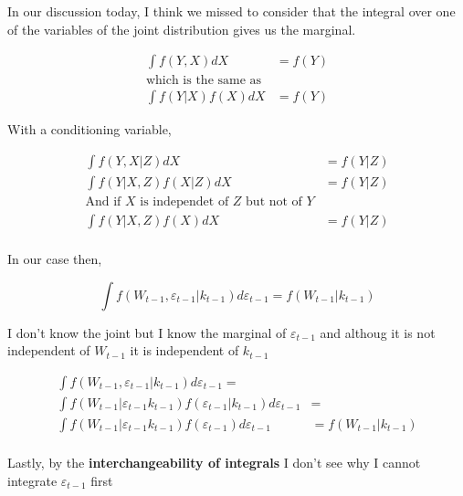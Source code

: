 \documentclass[
  letterpaper,
  DIV=11,
  numbers=noendperiod]{scrartcl}
\author{}
\date{}
\begin{document}
In our discussion today, I think we missed to consider that the integral
over one of the variables of the joint distribution gives us the
marginal.

\[
\begin{aligned}
\int f(Y,X) dX &= f(Y)\\
\text{which is the same as }\\
\int f(Y|X) f(X) dX &= f(Y)
\end{aligned}
\]

With a conditioning variable,

\[
\begin{aligned}
\int f(Y,X|Z) dX &= f(Y|Z)\\
\int f(Y|X,Z) f(X|Z) dX &= f(Y|Z)\\
\text{And if $X$ is independet of $Z$ but not of $Y$}\\
\int f(Y|X,Z) f(X) dX &= f(Y|Z)\\
\end{aligned}
\]

In our case then,

\[
\int f(W_{t-1},\varepsilon_{t-1}|k_{t-1}) d \varepsilon_{t-1}= f(W_{t-1}|k_{t-1})
\]

I don't know the joint but I know the marginal of \(\varepsilon_{t-1}\)
and althoug it is not independent of \(W_{t-1}\) it is independent of
\(k_{t-1}\)

\[
\begin{aligned}
\int f(W_{t-1},\varepsilon_{t-1}|k_{t-1}) d \varepsilon_{t-1}=\\ 
\int f(W_{t-1}|\varepsilon_{t-1}k_{t-1})f(\varepsilon_{t-1}|k_{t-1}) d \varepsilon_{t-1} &=  \\
\int f(W_{t-1}|\varepsilon_{t-1}k_{t-1})f(\varepsilon_{t-1}) d \varepsilon_{t-1} &= f(W_{t-1}|k_{t-1}) \\
\end{aligned}
\]

Lastly, by the \textbf{interchangeability of integrals} I don't see why
I cannot integrate \(\varepsilon_{t-1}\) first
\end{document}
